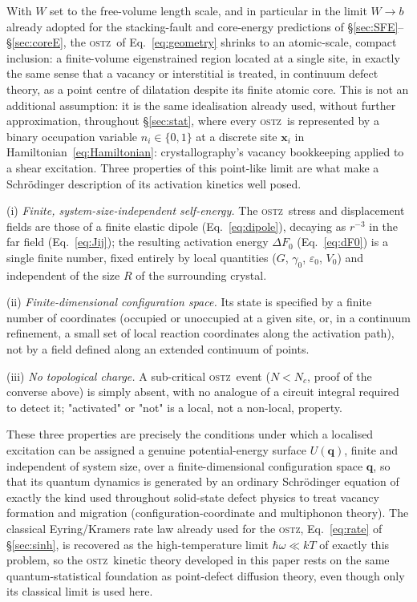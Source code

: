 \documentclass[3p]{elsarticle}
\newcommand{\OSTZ}{\textsc{ostz}}
\newcommand{\dF}{\Delta F_0}
\newcommand{\gz}{\gamma_0}
\begin{document}
With $W$ set to the free-volume length scale, and in particular in
the limit $W\to b$ already adopted for the stacking-fault and
core-energy predictions of \S\ref{sec:SFE}--\S\ref{sec:coreE}, the
\OSTZ\ of Eq.~\eqref{eq:geometry} shrinks to an atomic-scale,
compact inclusion: a finite-volume eigenstrained region located at a
single site, in exactly the same sense that a vacancy or
interstitial is treated, in continuum defect theory, as a point
centre of dilatation despite its finite atomic core. This is not an
additional assumption: it is the same idealisation already used,
without further approximation, throughout \S\ref{sec:stat}, where
every \OSTZ\ is represented by a binary occupation variable
$n_i\in\{0,1\}$ at a discrete site $\mathbf x_i$ in
Hamiltonian~\eqref{eq:Hamiltonian}: crystallography's vacancy
bookkeeping applied to a shear excitation. Three properties of this
point-like limit are what make a Schr\"odinger description of its
activation kinetics well posed.

(i) \emph{Finite, system-size-independent self-energy.} The \OSTZ\
stress and displacement fields are those of a finite elastic dipole
(Eq.~\eqref{eq:dipole}), decaying as $r^{-3}$ in the far field
(Eq.~\eqref{eq:Jij}); the resulting activation energy $\dF$
(Eq.~\eqref{eq:dF0}) is a single finite number, fixed entirely by
local quantities ($G$, $\gz$, $\varepsilon_0$, $V_0$) and independent
of the size $R$ of the surrounding crystal.

(ii) \emph{Finite-dimensional configuration space.} Its state is
specified by a finite number of coordinates (occupied or
unoccupied at a given site, or, in a continuum refinement, a small
set of local reaction coordinates along the activation path), not
by a field defined along an extended continuum of points.

(iii) \emph{No topological charge.} A sub-critical \OSTZ\ event
($N<N_c$, proof of the converse above) is simply absent, with no
analogue of a circuit integral required to detect it; "activated" or
"not" is a local, not a non-local, property.

These three properties are precisely the conditions under which a
localised excitation can be assigned a genuine potential-energy
surface $U(\mathbf q)$, finite and independent of system size,
over a finite-dimensional configuration space $\mathbf q$, so
that its quantum dynamics is generated by an ordinary Schr\"odinger
equation of exactly the kind used throughout solid-state defect
physics to treat vacancy formation and migration
(configuration-coordinate and multiphonon theory). The classical
Eyring/Kramers rate law already used for the \OSTZ,
Eq.~\eqref{eq:rate} of \S\ref{sec:sinh}, is recovered as the
high-temperature limit $\hbar\omega\ll kT$ of exactly this problem,
so the \OSTZ\ kinetic theory developed in this paper rests on the
same quantum-statistical foundation as point-defect diffusion
theory, even though only its classical limit is used here.
\end{document}
